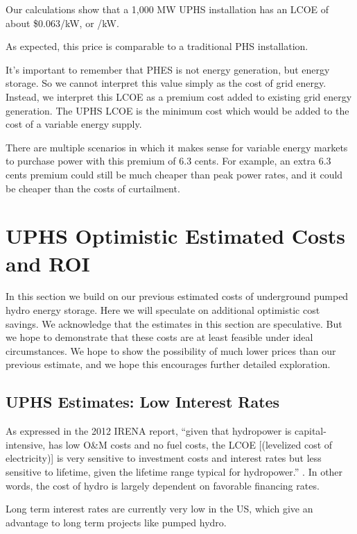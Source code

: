 \documentclass[hidelinks,12pt,a4paper]{article}
\begin{document}
\begin{displayquote}
Our calculations show that a 1,000 MW UPHS installation has an LCOE of about \$0.063/kW, or /kW.
\end{displayquote}

As expected, this price is comparable to a traditional PHS installation.

It's important to remember that PHES is not energy generation, but energy storage. So we cannot interpret this value simply as the cost of grid energy. Instead, we interpret this LCOE as a premium cost added to existing grid energy generation. The UPHS LCOE is the minimum cost which would be added to the cost of a variable energy supply.

There are multiple scenarios in which it makes sense for variable energy markets to purchase power with this premium of 6.3 cents. For example, an extra 6.3 cents premium could still be much cheaper than peak power rates, and it could be cheaper than the costs of curtailment.


\pagebreak[1]
\section{UPHS Optimistic Estimated Costs and ROI}
In this section we build on our previous estimated costs of underground pumped hydro energy storage. Here we will speculate on additional optimistic cost savings. We acknowledge that the estimates in this section are speculative. But we hope to demonstrate that these costs are at least feasible under ideal circumstances. We hope to show the possibility of much lower prices than our previous estimate, and we hope this encourages further detailed exploration.

\subsection{UPHS Estimates: Low Interest Rates}
As expressed in the 2012 IRENA report, “given that hydropower is capital-intensive, has low O\&M costs and no fuel costs, the LCOE [(levelized cost of electricity)] is very sensitive to investment costs and interest rates but less sensitive to lifetime, given the lifetime range typical for hydropower.” \cite{RenewableEnergyTechnologiesCostAnalysisSeries}. In other words, the cost of hydro is largely dependent on favorable financing rates.

Long term interest rates are currently very low in the US, which give an advantage to long term projects like pumped hydro.
\end{document}
